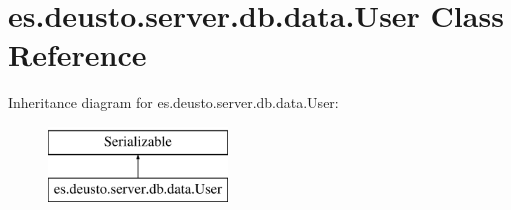 \hypertarget{classes_1_1deusto_1_1server_1_1db_1_1data_1_1_user}{}\section{es.\+deusto.\+server.\+db.\+data.\+User Class Reference}
\label{classes_1_1deusto_1_1server_1_1db_1_1data_1_1_user}
Inheritance diagram for es.\+deusto.\+server.\+db.\+data.\+User\+:\begin{figure}[H]
\begin{center}
\leavevmode
\includegraphics[height=2.000000cm]{classes_1_1deusto_1_1server_1_1db_1_1data_1_1_user}
\end{center}
\end{figure}
